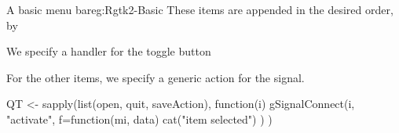 \begin{example}{A basic menu bar}{eg:Rgtk2-Basic}
These items are appended in the desired order, by
\begin{Schunk}
\end{Schunk}
We specify a handler for the toggle button
\begin{Schunk}
\end{Schunk}
For the other  items, we specify a generic action for the  signal.
\begin{Schunk}
\begin{Sinput}
 QT <- sapply(list(open, quit, saveAction), function(i) 
        gSignalConnect(i, "activate", f=function(mi, data) {
          cat("item selected\n")
        })
        )
\end{Sinput}
\end{Schunk}

\end{example}

